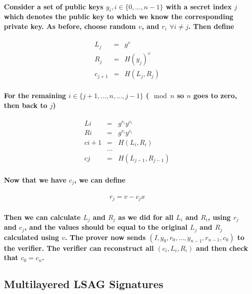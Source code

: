 \documentclass{article}
\begin{document}
\paragraph{Consider a set of public keys $y_i, i \in \{0, …, n-1\}$ with a secret index $j$ which denotes the public key to which we know the corresponding private key.  As before, choose random $v$, and $r_i$ $\forall i \ne j$.  Then define}

\begin{eqnarray}
      L_j &=& g^v\\
      R_j &=& H(y_j)^v\\
  c_{j+1} &=& H(L_j,R_j)
\end{eqnarray}

\paragraph{For the remaining $i \in \{j+1, …, n, …, j-1\}$ ($\mod{n}$ so $n$ goes to zero, then back to $j$)}

\begin{eqnarray}
  Li &=& g^{r_i} y^{c_i}\\
  Ri &=& g^{r_i} y^{c_i}\\
  ci+1 &=& H(L_i,R_i)\\
  &...& \\
  cj &=& H(L_{j-1}, R_{j-1})
\end{eqnarray}

\paragraph{Now that we have $c_j$, we can define}

\begin{eqnarray}
  r_j = v - c_j x
\end{eqnarray}

\paragraph{Then we can calculate $L_j$ and $R_j$ as we did for all $L_i$ and $R_i$, using $r_j$ and $c_j$, and the values should be equal to the original $L_j$ and $R_j$ calculated using $v$. The prover now sends $(I, y_0, r_0, …, y_{n-1}, r_{n-1}, c_0)$ to the verifier.  The verifier can reconstruct all $(c_i, L_i, R_i)$ and then check that $c_0 = c_n$.}


\subsection{Multilayered LSAG Signatures}
\end{document}
